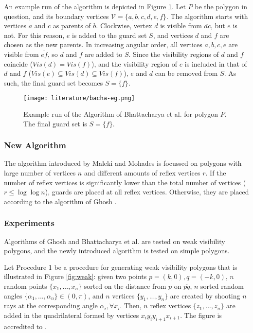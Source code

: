 An example run of the algorithm is depicted in Figure \ref{fig:bhaca}. Let $P$ be the polygon in question, and its boundary vertices $\mathcal V = \{a, b, c, d, e, f\}$. The algorithm starts with vertices $a$ and $c$ as parents of $b$. Clockwise, vertex $d$ is visible from $\overline{ac}$, but $e$ is not. For this reason, $e$ is added to the guard set $S$, and vertices $d$ and $f$ are chosen as the new parents. In increasing angular order, all vertices $a, b, c, e$ are visible from $\overline{ef}$, so $d$ and $f$ are added to $S$. Since the visibility regions of $d$ and $f$ coincide ($Vis(d) = Vis(f)$), and the visibility region of $e$ is included in that of $d$ and $f$ ($Vis(e) \subseteq Vis(d) \subseteq Vis(f)$), $e$ and $d$ can be removed from $S$. As such, the final guard set becomes $S = \{f\}$.

\begin{figure}[h!]
    \centering
    \texttt{[image: literature/bacha-eg.png]}
    \caption{Example run of the Algorithm of Bhattacharya et al. \cite{bhattacharya2016approximability} for polygon $P$. The final guard set is $S = \{f\}$.}
    \label{fig:bhaca}
\end{figure}

\newpage
\subsubsection{New Algorithm}
The algorithm introduced by Maleki and Mohades is focussed on polygons with large number of vertices $n$ and different amounts of reflex vertices $r$. If the number of reflex vertices is significantly lower than the total number of vertices ($r \leq \log \log n$), guards are placed at all reflex vertices. Otherwise, they are placed according to the algorithm of Ghosh \cite{GHOSH2010718}.

\subsubsection{Experiments}
Algorithms of Ghosh \cite{GHOSH2010718} and Bhattacharya et al. \cite{bhattacharya2016approximability} are tested on weak visibility polygons, and the newly introduced algorithm is tested on simple polygons. 

Let Procedure 1 be a procedure for generating weak visibility polygons that is illustrated in Figure \ref{fig:weak}: given two points $p = (k, 0), q = (-k, 0)$,  $n$ random points $\{x_1, ..., x_n\}$ sorted on the distance from $p$ on $\overline{pq}$, $n$ sorted random angles $\{\alpha_1, ..., \alpha_n\} \in  (0, \pi)$, and $n$ vertices $\{y_1, ..., y_n\}$ are created by shooting $n$ rays at the corresponding angle $\alpha_i, \forall x_i$. Then, $n$ reflex vertices $\{z_1, ..., z_n\}$ are added in the quadrilateral formed by vertices $x_iy_iy_{i + 1}x_{i + 1}$. The figure is accredited to \cite{maleki2022implementation}.

